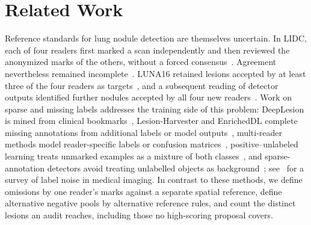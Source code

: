 \section{Related Work}
\label{sec:related}

Reference standards for lung nodule detection are themselves uncertain. In LIDC, each of four readers first marked a scan independently and then reviewed the anonymized marks of the others, without a forced consensus~\cite{armato2007variability,armato2011}. Agreement nevertheless remained incomplete~\cite{armato2009truth}. LUNA16 retained lesions accepted by at least three of the four readers as targets~\cite{setio2017}, and a subsequent reading of detector outputs identified further nodules accepted by all four new readers~\cite{jacobs2016cad}. Work on sparse and missing labels addresses the training side of this problem: DeepLesion is mined from clinical bookmarks~\cite{yan2018}, Lesion-Harvester and EnrichedDL complete missing annotations from additional labels or model outputs~\cite{cai2021,ma2024}, multi-reader methods model reader-specific labels or confusion matrices~\cite{dawid1979,raykar2010crowds,tanno2019,wu2024}, positive--unlabeled learning treats unmarked examples as a mixture of both classes~\cite{kiryo2017,bekker2018}, and sparse-annotation detectors avoid treating unlabelled objects as background~\cite{niitani2019sparse}; see~\cite{karimi2020noisy} for a survey of label noise in medical imaging. In contrast to these methods, we define omissions by one reader's marks against a separate spatial reference, define alternative negative pools by alternative reference rules, and count the distinct lesions an audit reaches, including those no high-scoring proposal covers.

